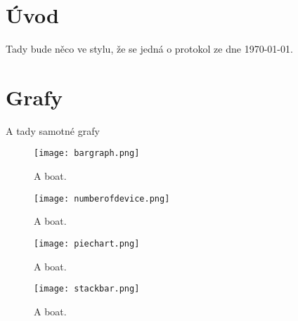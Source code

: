 \documentclass[12pt]{article}
\begin{document}
\tableofcontents

\section{Úvod}

Tady bude něco ve stylu, že se jedná o protokol ze dne \today.

\section{Grafy}
A tady samotné grafy
\begin{figure}[h!]
    \texttt{[image: bargraph.png]}
    \caption{A boat.}
    \label{fig:boat1}
  \end{figure}

  \begin{figure}[h!]
    \texttt{[image: numberofdevice.png]}
    \caption{A boat.}
    \label{fig:boat1}
  \end{figure}

  \begin{figure}[h!]
    \texttt{[image: piechart.png]}
    \caption{A boat.}
    \label{fig:boat1}
  \end{figure}

  \begin{figure}[h!]
    \texttt{[image: stackbar.png]}
    \caption{A boat.}
    \label{fig:boat1}
  \end{figure}
\end{document}
